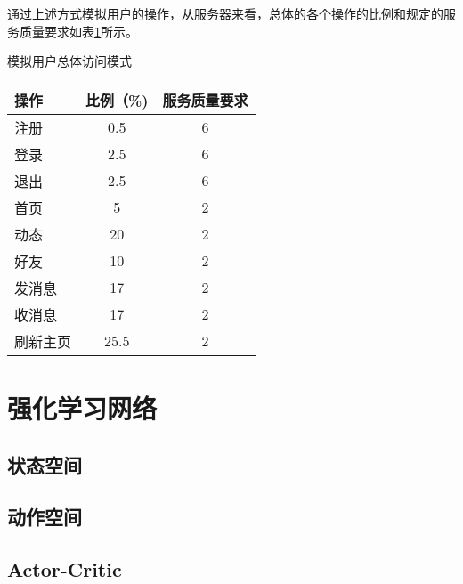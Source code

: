 通过上述方式模拟用户的操作，从服务器来看，总体的各个操作的比例和规定的服务质量要求如表\ref{tab:mix}所示。

\begin{table}
  \centering
    {模拟用户总体访问模式}
  \label{tab:mix}
  \begin{tabular}{@{}lcc@{}} \toprule
     操作 & 比例（\%) & 服务质量要求\\ \midrule
     注册 & 0.5 & 6 \\
     登录 & 2.5 & 6 \\
     退出 & 2.5 & 6 \\
     首页 & 5 & 2 \\
     动态 & 20 & 2 \\
     好友 & 10 & 2 \\
     发消息 & 17 & 2 \\
     收消息 & 17 & 2 \\
     刷新主页 & 25.5 & 2\\
\bottomrule
  \end{tabular}
\end{table}

\section{强化学习网络}
\subsection{状态空间}
\subsection{动作空间}
\subsection{Actor-Critic}
